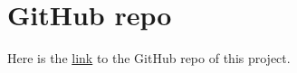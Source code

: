 \documentclass[
  11pt,
  a4paper,
]{article}
\begin{document}
\section{GitHub repo}\label{github-repo}

Here is the \href{https://github.com/justin-git01/ltd_forecasting}{link}
to the GitHub repo of this project.


\printbibliography
\end{document}
